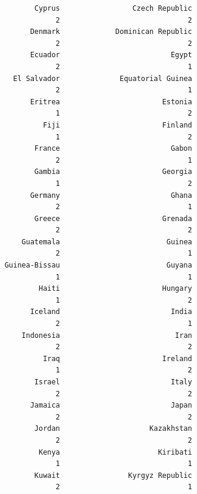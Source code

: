 \documentclass[
]{article}
\begin{document}
\begin{verbatim}
                        Cyprus                 Czech Republic 
                             2                              2 
                       Denmark             Dominican Republic 
                             2                              2 
                       Ecuador                          Egypt 
                             2                              1 
                   El Salvador              Equatorial Guinea 
                             2                              1 
                       Eritrea                        Estonia 
                             1                              2 
                          Fiji                        Finland 
                             1                              2 
                        France                          Gabon 
                             2                              1 
                        Gambia                        Georgia 
                             1                              2 
                       Germany                          Ghana 
                             2                              1 
                        Greece                        Grenada 
                             2                              2 
                     Guatemala                         Guinea 
                             2                              1 
                 Guinea-Bissau                         Guyana 
                             1                              1 
                         Haiti                        Hungary 
                             1                              2 
                       Iceland                          India 
                             2                              1 
                     Indonesia                           Iran 
                             2                              2 
                          Iraq                        Ireland 
                             1                              2 
                        Israel                          Italy 
                             2                              2 
                       Jamaica                          Japan 
                             2                              2 
                        Jordan                     Kazakhstan 
                             2                              2 
                         Kenya                       Kiribati 
                             1                              1 
                        Kuwait                Kyrgyz Republic 
                             2                              1 

\end{verbatim}
\end{document}
